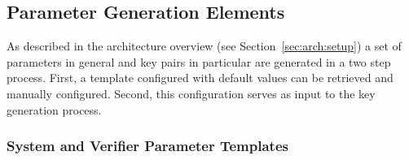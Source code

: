 % 
% 
% 
% 
% 
% 




\subsection{Parameter Generation Elements}

As described in the architecture overview (see Section~\ref{sec:arch:setup}) a set of parameters in general 
and key pairs in particular are generated in a two step process.
First, a template configured with default values can be retrieved and manually configured.
Second, this configuration serves as input to the key generation process.


\subsubsection{System and Verifier Parameter Templates}


